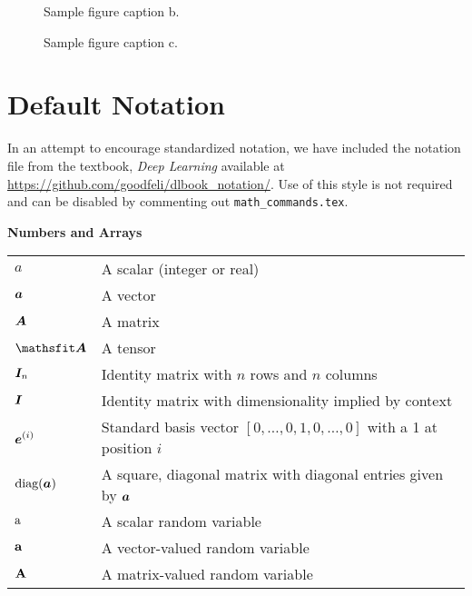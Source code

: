 \documentclass{article} %
\begin{document}
\begin{figure}[h]
\begin{center}
\fbox{\rule[-.5cm]{0cm}{4cm} \rule[-.5cm]{4cm}{0cm}}
\end{center}
\caption{Sample figure caption b.}
\end{figure}

\begin{figure}[h]
\begin{center}
\fbox{\rule[-.5cm]{0cm}{4cm} \rule[-.5cm]{4cm}{0cm}}
\end{center}
\caption{Sample figure caption c.}
\end{figure}



\section{Default Notation}

In an attempt to encourage standardized notation, we have included the
notation file from the textbook, \textit{Deep Learning}
\cite{goodfellow2016deep} available at
\url{https://github.com/goodfeli/dlbook_notation/}.  Use of this style
is not required and can be disabled by commenting out
\texttt{math\_commands.tex}.


\centerline{\bf Numbers and Arrays}
\bgroup
\def\arraystretch{1.5}
\begin{tabular}{p{1in}p{3.25in}}
$\displaystyle a$ & A scalar (integer or real)\\
$\displaystyle {\bm{a}}$ & A vector\\
$\displaystyle {\bm{A}}$ & A matrix\\
$\displaystyle \tA$ & A tensor\\
$\displaystyle {\bm{I}}_n$ & Identity matrix with $n$ rows and $n$ columns\\
$\displaystyle {\bm{I}}$ & Identity matrix with dimensionality implied by context\\
$\displaystyle {\bm{e}}^{(i)}$ & Standard basis vector $[0,\dots,0,1,0,\dots,0]$ with a 1 at position $i$\\
$\displaystyle \text{diag}({\bm{a}})$ & A square, diagonal matrix with diagonal entries given by ${\bm{a}}$\\
$\displaystyle {\textnormal{a}}$ & A scalar random variable\\
$\displaystyle {\mathbf{a}}$ & A vector-valued random variable\\
$\displaystyle {\mathbf{A}}$ & A matrix-valued random variable\\
\end{tabular}
\egroup
\vspace{0.25cm}
\end{document}
